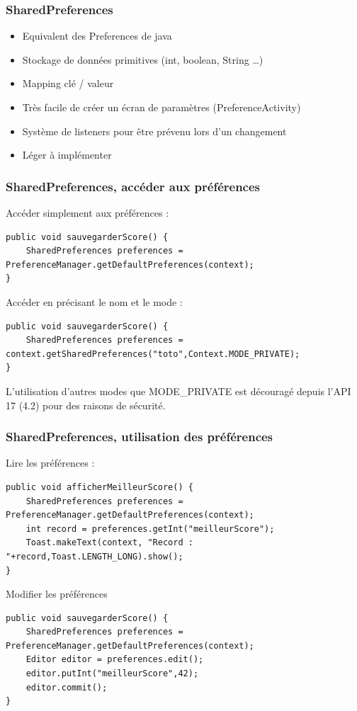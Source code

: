 \documentclass{beamer}
\begin{document}
\begin{frame}
\frametitle{SharedPreferences}
\begin{itemize}
    \item Equivalent des Preferences de java
    \item Stockage de données primitives (int, boolean, String \ldots)
    \item Mapping clé / valeur
    \item Très facile de créer un écran de paramètres (PreferenceActivity)
    \item Système de listeners pour être prévenu lors d'un changement
    \item Léger à implémenter
\end{itemize}
\end{frame}
\begin{frame}[fragile]
\frametitle{SharedPreferences, accéder aux préférences}
Accéder simplement aux préférences :\\
\begin{lstlisting}
public void sauvegarderScore() {
    SharedPreferences preferences = PreferenceManager.getDefaultPreferences(context);
}
\end{lstlisting}
Accéder en précisant le nom et le mode :\\
\begin{lstlisting}
public void sauvegarderScore() {
    SharedPreferences preferences = context.getSharedPreferences("toto",Context.MODE_PRIVATE);
}
\end{lstlisting}
L'utilisation d'autres modes que MODE\_PRIVATE est découragé depuis l'API 17 (4.2) pour des raisons de sécurité.\\
\end{frame}
\begin{frame}[fragile]
\frametitle{SharedPreferences, utilisation des préférences}
Lire les préférences :\\
\begin{lstlisting}
public void afficherMeilleurScore() {
    SharedPreferences preferences = PreferenceManager.getDefaultPreferences(context);
    int record = preferences.getInt("meilleurScore");
    Toast.makeText(context, "Record : "+record,Toast.LENGTH_LONG).show();
}
\end{lstlisting}
Modifier les préférences\\
\begin{lstlisting}
public void sauvegarderScore() {
    SharedPreferences preferences = PreferenceManager.getDefaultPreferences(context);
    Editor editor = preferences.edit();
    editor.putInt("meilleurScore",42);
    editor.commit();
}
\end{lstlisting}
\end{frame}
\end{document}
